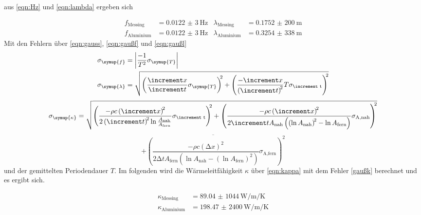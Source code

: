 aus \eqref{eqn:Hz} und \eqref{eqn:lambda} ergeben sich

\begin{align*}
  f_\text{Messing} &= \SI{0,0122(3)}{\hertz} & \lambda_\text{Messing} &= \SI{0,1752(200)}{\meter}\\
  f_\text{Aluminium} &= \SI{0,0122(3)}{\hertz} & \lambda_\text{Aluminium} &= \SI{0,3254(338)}{\meter}
\end{align*}
Mit den Fehlern über \eqref{eqn:gauss}, \eqref{eqn:gaußf} und \eqref{eqn:gaußl}
\begin{align}
  \sigma_\symup{f}&=\left|\frac{-1}{T^2}\sigma_\symup{T}\right|
  \label{eqn:gaußf}\\
  \sigma_\symup{\lambda}&=\sqrt{\left(\frac{\increment x}{\increment t}\sigma_\symup{T}\right)^{\!\!2}
    +\left(\frac{-\increment x}{\left(\increment t\right)^{\!2}}T\sigma_\text{\increment t}\right)^{\!\!2}}
  \label{eqn:gaußl}
\end{align}
\begin{equation*}
    \sigma_\symup{\kappa} = \sqrt{
    \left(\frac{-\rho c\left(\increment x\right)^{\!2}}{2\left(\increment t\right)^{\!2}\ln{\frac{A_\text{nah}}{A_\text{fern}}}}\sigma_\text{\increment t}\right)^{\!\!2}
    +\left(\frac{-\rho c\left(\increment x\right)^{\!2}}{2 \increment t A_\text{nah}\left(\left(\ln{A_\text{nah}}\right)^{\!2}-\ln{A_\text{fern}}\right)}\sigma_\text{A,nah}\right)^{\!\!2}}\\
\end{equation*}
\begin{equation}
  \overline{+\left(\frac{-\rho c\left(\increment x\right)^{\!2}}{2 \increment t A_\text{fern}\left(\ln{A_\text{nah}}-\left(\ln{A_\text{fern}}\right)^{\!2}\right)}\sigma_\text{A,fern}\right)^{\!\!2}}
  \label{gaußk}
\end{equation}
und der gemittelten Periodendauer $T$. Im folgenden wird die Wärmeleitfähigkeit $\kappa$ über \eqref{eqn:kappa}
mit dem Fehler \eqref{gaußk} berechnet und es ergibt sich.

\begin{align*}
  \kappa_\text{Messing} &= \SI{89,04(1044)}{\watt\per\meter\per\kelvin}\\
  \kappa_\text{Aluminium} &= \SI{198,47(2400)}{\watt\per\meter\per\kelvin}
\end{align*}

